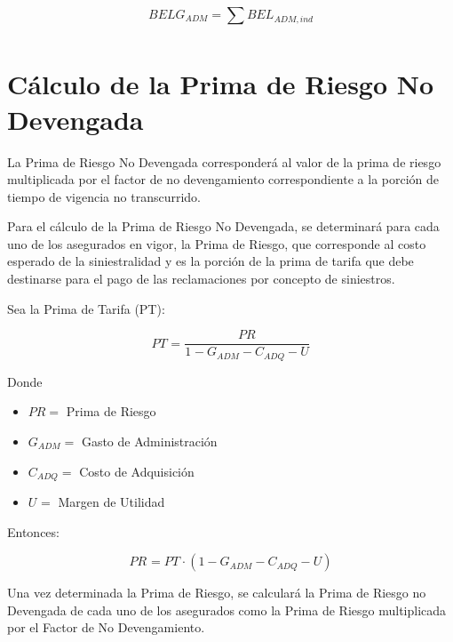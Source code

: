 \documentclass[11pt,twoside,openright,spanish]{report}
\numberwithin{equation}{chapter}
\numberwithin{figure}{chapter}
\numberwithin{table}{chapter}
\begin{document}
\begin{equation}
	BELG_{ADM}=\sum _{}^{}BEL_{ADM,ind}^{}
	\label{eq11}
	\end{equation}


 
	
	\section{Cálculo de la Prima de Riesgo No Devengada}
	 
	
	La Prima de Riesgo No Devengada corresponderá al valor de la prima de riesgo multiplicada por el factor de no devengamiento correspondiente a la porción de tiempo de vigencia no transcurrido.
	
	 
	
	Para el cálculo de la Prima de Riesgo No Devengada, se determinará para cada uno de los asegurados en vigor, la Prima de Riesgo, que corresponde al costo esperado de la siniestralidad y es la porción de la prima de tarifa que debe destinarse para el pago de las reclamaciones por concepto de siniestros.
	
	 
	
	Sea la Prima de Tarifa (PT):
	
	 
\begin{equation}
		{PT}_{}^{}=\frac{{PR}_{}^{}}{{1}_{}-{}G_{ADM}-{C}_{ADQ}-{U}_{}}
		\label{eq12}
\end{equation}
 
	
	Donde
	
	 
		\begin{itemize}
		\setlength\itemsep{-0.5em}
	\item $PR=$ Prima de Riesgo
	
	\item $G_{ADM}^{}=$ Gasto de Administración
	
	\item $C_{ADQ}^{}=$ Costo de Adquisición
	
	\item $U_{}^{}=$ Margen de Utilidad
	\end{itemize}
	 
 
	
	Entonces:
	
\begin{equation}
		{PR}_{}^{}={{PT}_{}\cdot(1-G_{ADM}-C_{ADQ}-U)}
		\label{eq13}
		\end{equation}


	Una vez determinada la Prima de Riesgo, se calculará la Prima de Riesgo no Devengada de cada uno de los asegurados como la Prima de Riesgo multiplicada por el Factor de No Devengamiento.
		
\end{document}
